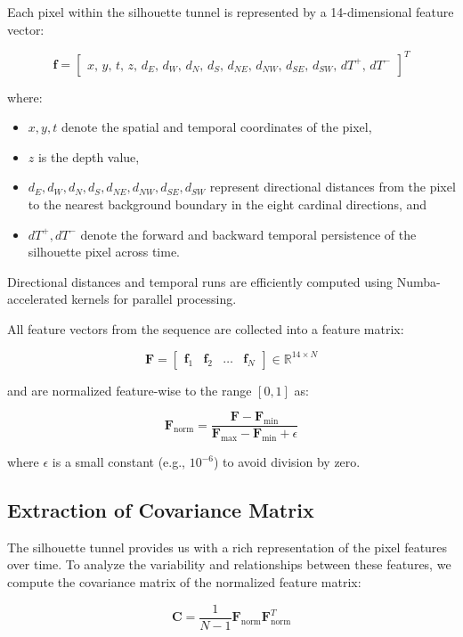 Each pixel within the silhouette tunnel is represented by a 14-dimensional feature vector:

\[
\mathbf{f} =
\begin{bmatrix}
x,\, y,\, t,\, z,\,
d_E,\, d_W,\, d_N,\, d_S,\,
d_{NE},\, d_{NW},\, d_{SE},\, d_{SW},\,
dT^{+},\, dT^{-}
\end{bmatrix}^{T}
\]

where:
\begin{itemize}
    \item $x, y, t$ denote the spatial and temporal coordinates of the pixel,  
    \item $z$ is the depth value,  
    \item $d_{E}, d_{W}, d_{N}, d_{S}, d_{NE}, d_{NW}, d_{SE}, d_{SW}$ represent directional distances from the pixel to the nearest background boundary in the eight cardinal directions, and  
    \item $dT^{+}, dT^{-}$ denote the forward and backward temporal persistence of the silhouette pixel across time.  
\end{itemize}

Directional distances and temporal runs are efficiently computed using Numba-accelerated kernels for parallel processing.

All feature vectors from the sequence are collected into a feature matrix:

\[
\mathbf{F} =
\begin{bmatrix}
\mathbf{f}_1 & \mathbf{f}_2 & \dots & \mathbf{f}_N
\end{bmatrix}
\in \mathbb{R}^{14 \times N}
\]

and are normalized feature-wise to the range $[0, 1]$ as:

\[
\mathbf{F}_{\text{norm}} = \frac{\mathbf{F} - \mathbf{F}_{\min}}{\mathbf{F}_{\max} - \mathbf{F}_{\min} + \epsilon}
\]

where $\epsilon$ is a small constant (e.g., $10^{-6}$) to avoid division by zero.


\subsection{Extraction of Covariance Matrix}
The silhouette tunnel provides us with a rich representation of the pixel features over time. To analyze the variability and relationships between these features, we compute the covariance matrix of the normalized feature matrix:

\[
\mathbf{C} = \frac{1}{N-1} \mathbf{F}_{\text{norm}} \mathbf{F}_{\text{norm}}^{T}
\]

